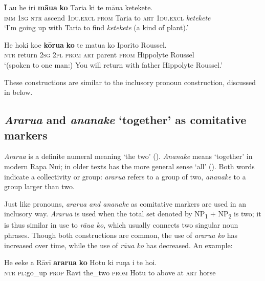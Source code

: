 \ea\label{ex:8.194}
\gll {\ꞌ}Ī au he iri \textbf{māua} \textbf{ko} Taria ki te māua ketekete. \\
\textsc{imm} \textsc{1sg} \textsc{ntr} ascend \textsc{1du.excl} \textsc{prom} Taria to \textsc{art} \textsc{1du.excl} \textit{ketekete} \\

\glt 
‘I’m going up with Taria to find \textit{ketekete} (a kind of plant).’ \textstyleExampleref{[R153.021]} 
\z

\ea\label{ex:8.195}
\gll He hoki koe \textbf{kōrua} \textbf{ko} te matu{\ꞌ}a ko Iporito Roussel. \\
\textsc{ntr} return \textsc{2sg} \textsc{2pl} \textsc{prom} \textsc{art} parent \textsc{prom} Hippolyte Roussel \\

\glt
‘(spoken to one man:) You will return with father Hippolyte Roussel.’ \textstyleExampleref{[R231.258]} 
\z

These constructions are similar to the inclusory pronoun construction, discussed in  below.

\subsection{\textit{Ararua} and \textit{ananake} ‘together’ as comitative markers}\label{sec:8.10.3}
\textit{Ararua} is a definite numeral meaning ‘the two’ (). \textit{Ananake} means ‘together’ in modern Rapa Nui; in older texts has the more general sense ‘all’ (). Both words indicate a collectivity or group: \textit{ararua} refers to a group of two, \textit{ananake} to a group larger than two.

Just like pronouns, \textit{ararua and ananake} as comitative markers are used in an inclusory way. \textit{Ararua} is used when the total set denoted by NP\textsubscript{1} + NP\textsubscript{2} is two; it is thus similar in use to \textit{rāua ko}, which usually connects two singular noun phrases. Though both constructions are common, the use of \textit{ararua ko} has increased over time, while the use of \textit{rāua ko} has decreased. An example:

\ea\label{ex:8.196}
\gll He eeke a Rāvī \textbf{ararua} \textbf{ko} Hotu ki ruŋa i te hoi.\\
\textsc{ntr} \textsc{pl}:go\_up \textsc{prop} Ravi the\_two \textsc{prom} Hotu to above at \textsc{art} horse\\

